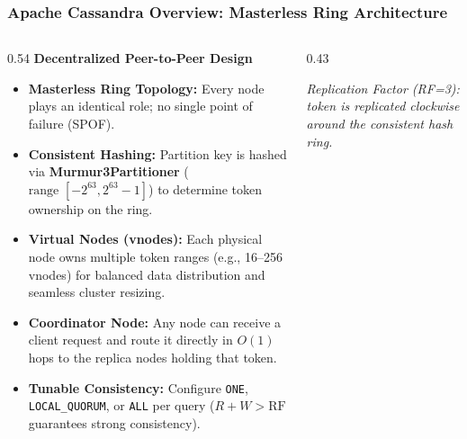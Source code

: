 \documentclass[aspectratio=169]{beamer}
\begin{document}
\begin{frame}
\frametitle{Apache Cassandra Overview: Masterless Ring Architecture}
\begin{columns}[T]
\begin{column}{0.54\textwidth}
\textbf{Decentralized Peer-to-Peer Design} \cite{cassandra,consistent_hashing}
\scriptsize
\begin{itemize}
    \item \textbf{Masterless Ring Topology:} Every node plays an identical role; no single point of failure (SPOF).
    \item \textbf{Consistent Hashing:} Partition key is hashed via \textbf{Murmur3Partitioner} ($\text{range } [-2^{63}, 2^{63}-1]$) to determine token ownership on the ring.
    \item \textbf{Virtual Nodes (vnodes):} Each physical node owns multiple token ranges (e.g., 16--256 vnodes) for balanced data distribution and seamless cluster resizing.
    \item \textbf{Coordinator Node:} Any node can receive a client request and route it directly in $O(1)$ hops to the replica nodes holding that token.
    \item \textbf{Tunable Consistency:} Configure \texttt{ONE}, \texttt{LOCAL\_QUORUM}, or \texttt{ALL} per query ($R + W > \text{RF}$ guarantees strong consistency).
\end{itemize}
\end{column}
\begin{column}{0.43\textwidth}
\centering
{}\par
\vspace{0.08cm}
\scriptsize
\textit{Replication Factor (RF=3): token is replicated clockwise around the consistent hash ring.}
\end{column}
\end{columns}
\end{frame}
\end{document}
